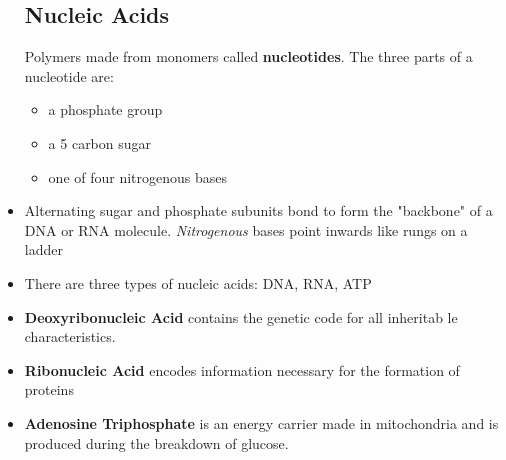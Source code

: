 \documentclass[letterpaper]{article}
\numberwithin{equation}{section}
\theoremstyle{classic}
\begin{document}
\begin{itemize}
    \subsection{Nucleic Acids}
    \begin{idea}
        Polymers made from monomers called \textbf{nucleotides}. The three parts of a nucleotide are:
        \begin{itemize}
            \item a phosphate group
            \item a 5 carbon sugar
            \item one of four nitrogenous bases
        \end{itemize}
    \end{idea}
    \item Alternating sugar and phosphate subunits bond to form the "backbone" of a DNA or RNA molecule. \textit{Nitrogenous} bases point inwards like rungs on a ladder
    \item There are three types of nucleic acids: DNA, RNA, ATP
    \item \textbf{Deoxyribonucleic Acid} contains the genetic code for all inheritab le characteristics.
    \item \textbf{Ribonucleic Acid} encodes information necessary for the formation of proteins
    \item \textbf{Adenosine Triphosphate} is an energy carrier made in mitochondria and is produced during the breakdown of glucose.
\end{itemize}
\newpage
\end{document}
